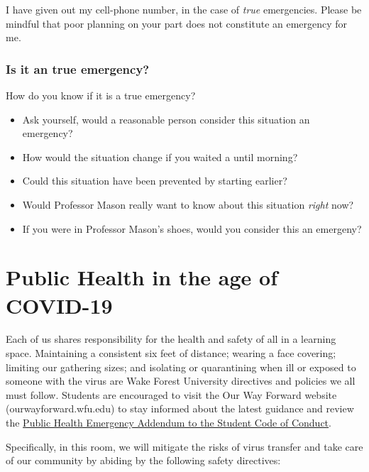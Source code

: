 \documentclass[11pt,]{article}
\providecommand{\tightlist}{%
  \setlength{\itemsep}{0pt}\setlength{\parskip}{0pt}}
\begin{document}
I have given out my cell-phone number, in the case of \emph{true}
emergencies. Please be mindful that poor planning on your part does not
constitute an emergency for me.

\hypertarget{is-it-an-true-emergency}{%
\subsubsection{Is it an true emergency?}\label{is-it-an-true-emergency}}

How do you know if it is a true emergency?

\begin{itemize}
\tightlist
\item
  Ask yourself, would a reasonable person consider this situation an
  emergency?
\item
  How would the situation change if you waited a until morning?
\item
  Could this situation have been prevented by starting earlier?
\item
  Would Professor Mason really want to know about this situation
  \emph{right} now?
\item
  If you were in Professor Mason's shoes, would you consider this an
  emergeny?
\end{itemize}

\hypertarget{public-health-in-the-age-of-covid-19}{%
\section{Public Health in the age of
COVID-19}\label{public-health-in-the-age-of-covid-19}}

Each of us shares responsibility for the health and safety of all in a
learning space. Maintaining a consistent six feet of distance; wearing a
face covering; limiting our gathering sizes; and isolating or
quarantining when ill or exposed to someone with the virus are Wake
Forest University directives and policies we all must follow. Students
are encouraged to visit the Our Way Forward website
(ourwayforward.wfu.edu) to stay informed about the latest guidance and
review the
\href{https://studentconduct.wfu.edu/undergraduate-student-handbook/minimum_expectations/public-health-emergency-addendum/}{Public
Health Emergency Addendum to the Student Code of Conduct}.

Specifically, in this room, we will mitigate the risks of virus transfer
and take care of our community by abiding by the following safety
directives:
\end{document}

